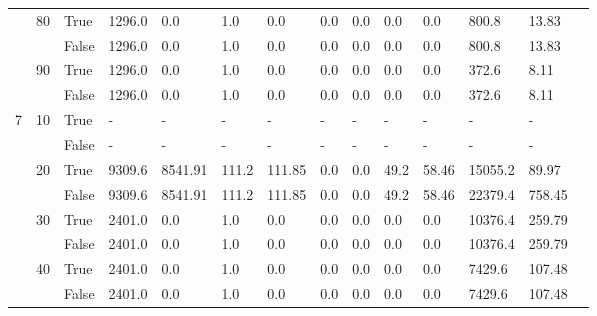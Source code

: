 \begin{landscape}
\begin{small}
\begin{longtable}[c]{@{}lll|ll|ll|ll|ll|lll@{}}
   & 80 & True  & 1296.0          & 0.0            & 1.0           & 0.0           & 0.0           & 0.0           & 0.0           & 0.0           & 800.8         & 13.83       &  \\
   &    & False & 1296.0          & 0.0            & 1.0           & 0.0           & 0.0           & 0.0           & 0.0           & 0.0           & 800.8         & 13.83       &  \\
   & 90 & True  & 1296.0          & 0.0            & 1.0           & 0.0           & 0.0           & 0.0           & 0.0           & 0.0           & 372.6         & 8.11        &  \\
   &    & False & 1296.0          & 0.0            & 1.0           & 0.0           & 0.0           & 0.0           & 0.0           & 0.0           & 372.6         & 8.11        &  \\
  \midrule
7  & 10 & True  & -               & -              & -             & -             & -             & -             & -             & -             & -             & -           &  \\
   &    & False & -               & -              & -             & -             & -             & -             & -             & -             & -             & -           &  \\
   & 20 & True  & 9309.6          & 8541.91        & 111.2         & 111.85        & 0.0           & 0.0           & 49.2          & 58.46         & 15055.2       & 89.97       &  \\
   &    & False & 9309.6          & 8541.91        & 111.2         & 111.85        & 0.0           & 0.0           & 49.2          & 58.46         & 22379.4       & 758.45      &  \\
   & 30 & True  & 2401.0          & 0.0            & 1.0           & 0.0           & 0.0           & 0.0           & 0.0           & 0.0           & 10376.4       & 259.79      &  \\
   &    & False & 2401.0          & 0.0            & 1.0           & 0.0           & 0.0           & 0.0           & 0.0           & 0.0           & 10376.4       & 259.79      &  \\
   & 40 & True  & 2401.0          & 0.0            & 1.0           & 0.0           & 0.0           & 0.0           & 0.0           & 0.0           & 7429.6        & 107.48      &  \\
   &    & False & 2401.0          & 0.0            & 1.0           & 0.0           & 0.0           & 0.0           & 0.0           & 0.0           & 7429.6        & 107.48      &  \\

\end{longtable}
\end{small}
\end{landscape}
